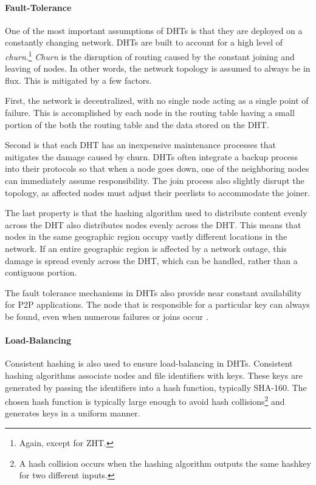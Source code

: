 \paragraph{Fault-Tolerance}
One of the most important assumptions of DHTs is that they are deployed on a constantly changing network.
DHTs are built to account for a high level of \textit{churn}.\footnote{Again, except for ZHT.}  
\textit{Churn} is the disruption of routing caused by the constant joining and leaving of nodes.
In other words, the network topology is assumed to always be in flux.
This is mitigated by a few factors.

First, the network is decentralized, with no single node acting as a single point of failure.
This is accomplished by each node in the routing table having a small portion of the both the routing table and the data stored on the DHT.

Second is that each DHT has an inexpensive maintenance processes that mitigates the damage caused by churn.
DHTs often integrate a backup process into their protocols so that when a node goes down, one of the neighboring nodes can immediately assume responsibility.
The join process also slightly disrupt the topology, as affected nodes must adjust their peerlists to accommodate the joiner. 

The last property is that the hashing algorithm used to distribute content evenly across the DHT also distributes nodes evenly across the DHT.  
This means that nodes in the same geographic region occupy vastly different locations in the network.  
If an entire geographic region is affected by a network outage, this damage is spread evenly across the DHT, which can be handled, rather than a contiguous portion.


The fault tolerance mechanisms in DHTs also provide near constant availability for P2P applications.
The node that is responsible for a particular key can always be found, even when numerous failures or joins occur \cite{chord}.


\paragraph{Load-Balancing}
Consistent hashing is also used to ensure load-balancing in DHTs.
Consistent hashing algorithms associate nodes and file identifiers with keys.  
These keys are generated by passing the identifiers into a hash function, typically SHA-160.
The chosen hash function is typically large enough to avoid hash collisions\footnote{A hash collision occurs when the hashing algorithm outputs the same hashkey for two different inputs.} and generates keys in a uniform manner. 

